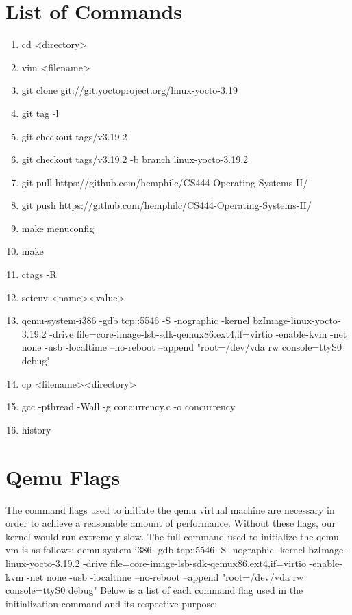 \documentclass[onecolumn, draftclsnofoot,10pt, compsoc]{IEEEtran}
\begin{document}

\section{List of Commands}

\begin{enumerate}

\item cd \textless directory\textgreater
\item vim \textless filename\textgreater
\item git clone git://git.yoctoproject.org/linux-yocto-3.19
\item git tag -l
\item git checkout tags/v3.19.2
\item git checkout tags/v3.19.2 -b branch linux-yocto-3.19.2
\item git pull https://github.com/hemphilc/CS444-Operating-Systems-II/
\item git push https://github.com/hemphilc/CS444-Operating-Systems-II/
\item make menuconfig
\item make
\item ctags -R
\item setenv \textless name\textgreater \textless value\textgreater
\item qemu-system-i386 -gdb tcp::5546 -S -nographic -kernel bzImage-linux-yocto-3.19.2 -drive file=core-image-lsb-sdk-qemux86.ext4,if=virtio -enable-kvm -net none -usb -localtime --no-reboot --append "root=/dev/vda rw console=ttyS0 debug"
\item cp \textless filename\textgreater \textless directory\textgreater
\item gcc -pthread -Wall -g concurrency.c -o concurrency
\item history

\end{enumerate}

\section{Qemu Flags}
The command flags used to initiate the qemu virtual machine are necessary in order to achieve a reasonable amount of performance. Without these flags, our kernel would run extremely slow. The full command used to initialize the qemu vm is as follows:\newline
\newline
\noindent qemu-system-i386 -gdb tcp::5546 -S -nographic -kernel bzImage-linux-yocto-3.19.2 -drive file=core-image-lsb-sdk-\newline qemux86.ext4,if=virtio -enable-kvm -net none -usb -localtime --no-reboot --append "root=/dev/vda rw console=ttyS0 debug"\newline
\newline
Below is a list of each command flag used in the initialization command and its respective purpose:
\end{document}
